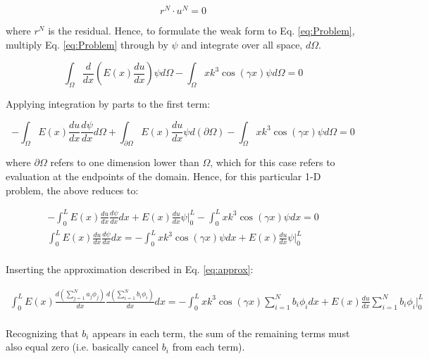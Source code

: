 \documentclass[10pt]{article}
\begin{document}
\begin{equation}
r^N\cdot u^N=0
\end{equation}

where \(r^N\) is the residual. Hence, to formulate the weak form to Eq. \eqref{eq:Problem}, multiply Eq. \eqref{eq:Problem} through by \(\psi\) and integrate over all space, \(d\Omega\).

\begin{equation}
\int_{\Omega}^{}\frac{d}{dx}\left(E(x)\frac{du}{dx}\right)\psi d\Omega-\int_{\Omega}^{}xk^3\cos{(\gamma x)}\psi d\Omega=0
\end{equation}

Applying integration by parts to the first term:

\begin{equation}
-\int_{\Omega}^{}E(x)\frac{du}{dx}\frac{d\psi}{dx}d\Omega+\int_{\partial\Omega}^{}E(x)\frac{du}{dx}\psi d(\partial\Omega)-\int_{\Omega}^{}xk^3\cos{(\gamma x)}\psi d\Omega=0
\end{equation}

where \(\partial\Omega\) refers to one dimension lower than \(\Omega\), which for this case refers to evaluation at the endpoints of the domain. Hence, for this particular 1-D problem, the above reduces to:

\begin{equation}
\begin{aligned}
-\int_{0}^{L}E(x)\frac{du}{dx}\frac{d\psi}{dx}dx+ E(x)\frac{du}{dx}\psi\biggr\vert_{0}^{L}-\int_{0}^{L}xk^3\cos{(\gamma x)}\psi dx=0\\
\int_{0}^{L}E(x)\frac{du}{dx}\frac{d\psi}{dx}dx=-\int_{0}^{L}xk^3\cos{(\gamma x)}\psi dx+E(x)\frac{du}{dx}\psi\biggr\vert_{0}^{L}\\
\end{aligned}
\end{equation}

Inserting the approximation described in Eq. \eqref{eq:approx}:

\begin{equation}
\begin{aligned}
\int_{0}^{L}E(x)\frac{d\left(\sum_{j=1}^{N}a_j\phi_j\right)}{dx}\frac{d\left(\sum_{i=1}^{N}b_i\phi_i\right)}{dx}dx=-\int_{0}^{L}xk^3\cos{(\gamma x)}\sum_{i=1}^{N}b_i\phi_idx+E(x)\frac{du}{dx}\sum_{i=1}^{N}b_i\phi_i\biggr\vert_{0}^{L}\\
\end{aligned}
\end{equation}

Recognizing that \(b_i\) appears in each term, the sum of the remaining terms must also equal zero (i.e. basically cancel \(b_i\) from each term).
\end{document}

